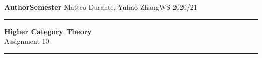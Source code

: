 \documentclass[a4paper,11pt,openany]{scrartcl}
\begin{document}
\noindent\textbf{Author}\hfill\textbf{Semester} \linebreak
\vspace*{-.1cm} Matteo Durante, Yuhao Zhang\hfill WS 2020/21 \\

\noindent
\rule{\linewidth}{1pt}
\begin{center}
\Large
\textbf{Higher Category Theory} \\
Assignment 10
\end{center}
\rule{\linewidth}{1pt}
\\


\newcommand{\La}{\Lambda}
\newcommand{\pa}{\partial}
\newcommand{\ob}{\operatorname{Ob}}
\newcommand{\mor}{\operatorname{Mor}}
\newcommand{\sto}{\twoheadrightarrow}

\newcommand{\plim}{\varprojlim}
\newcommand{\sst}{\subseteq}
\newcommand{\eq}{\operatorname{eq}}

\newcommand{\f}{\varphi}

\newcommand{\sing}{\operatorname{Sing}}

\newcommand{\ihom}{\underline{\Hom}}
\end{document}
